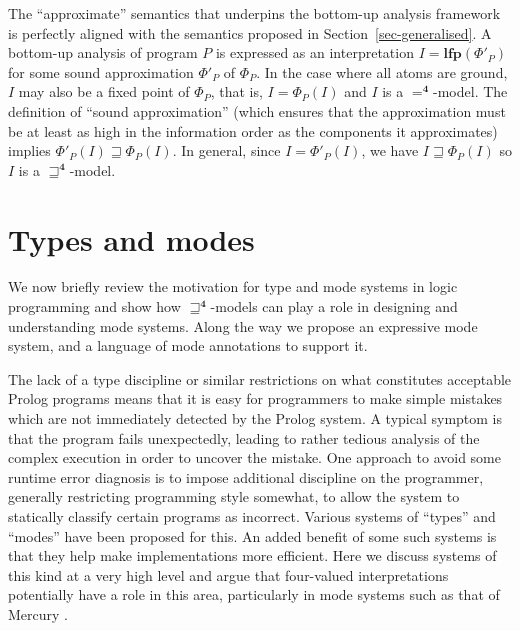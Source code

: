 \documentclass{tlp}
\newcommand{\Quad}{\ensuremath{\mathbf{4}}}
\newcommand{\lfp}{\mathbf{lfp}}
\begin{document}
The ``approximate'' semantics that underpins the bottom-up analysis 
framework is perfectly aligned with the semantics proposed in 
Section~\ref{sec-generalised}.
A bottom-up analysis of program $P$ is expressed as an interpretation $I =
\lfp(\Phi'_P)$ for some sound approximation $\Phi'_P$ of $\Phi_P$. In the
case where all atoms are ground, $I$ may also be a fixed point of $\Phi_P$,
that is, $I = \Phi_P(I)$ and $I$ is a $=^\Quad$-model.  The definition of
``sound approximation'' (which ensures that the approximation must be
at least as high in the information order as the components it approximates)
implies $\Phi'_P(I) \sqsupseteq \Phi_P(I)$.  In general, since $I =
\Phi'_P(I)$, we have $I \sqsupseteq \Phi_P(I)$ so $I$ is a
$\sqsupseteq^\Quad$-model.

\section{Types and modes}
\label{sec-modes}




We now briefly review the motivation for type and mode systems in logic
programming and show how $\sqsupseteq^\Quad$-models can play a role
in designing and understanding mode systems.
Along the way we propose an expressive mode system, 
and a language of mode annotations to support it.

The lack of a type discipline or similar restrictions on what 
constitutes acceptable Prolog programs means that it is easy for 
programmers to make simple mistakes which
are not immediately detected by the Prolog system.  
A typical symptom
is that the program fails unexpectedly, leading to rather tedious analysis
of the complex execution in order to uncover the mistake.  
One approach to avoid
some runtime error diagnosis is to impose additional discipline on the
programmer, generally restricting programming style somewhat, 
to allow the system to statically classify certain programs as incorrect.
Various systems of ``types'' and ``modes'' have been proposed for this.
An added benefit of some such systems is that they help
make implementations more efficient.  
Here we discuss systems of this kind
at a very high level and argue that four-valued interpretations
potentially have a role in this area, particularly in mode systems such
as that of Mercury \cite{mercury}.
\end{document}
